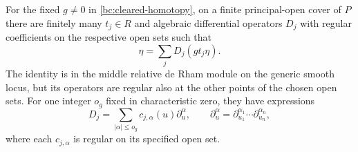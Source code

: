 \begin{lemma}\label{bc:differential-identity}
For the fixed $g\ne0$ in \eqref{bc:cleared-homotopy}, on a finite
principal-open cover of $P$ there are finitely many $t_j\in R$ and
algebraic differential operators $D_j$ with
regular coefficients on the respective open sets such that
\begin{equation}\label{bc:differential-equation}
                  \eta=\sum_j D_j(g t_j\eta).
\end{equation}
The identity is in the middle relative de Rham module on the generic
smooth locus, but its operators are regular also at the other points
of the chosen open sets.  For one integer $o_g$ fixed in characteristic
zero, they have expressions
\begin{equation}\label{bc:operator-bound}
 D_j=\sum_{|\alpha|\le o_g}c_{j,\alpha}(u)\partial_u^\alpha,
 \qquad
 \partial_u^\alpha=
 \partial_{u_1}^{\alpha_1}\cdots\partial_{u_n}^{\alpha_n},
\end{equation}
where each $c_{j,\alpha}$ is regular on its specified open set.
\end{lemma}


